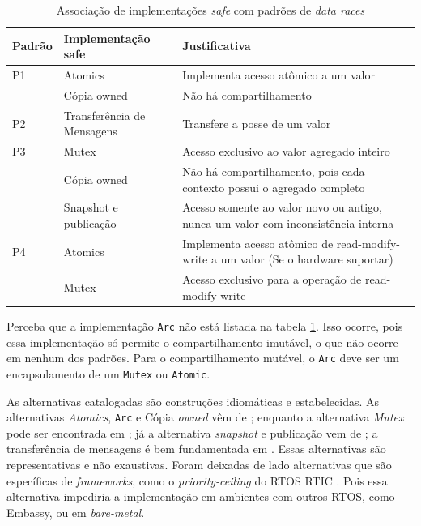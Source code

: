 \begin{table}[ht]
  \centering
  \caption{Associação de implementações \textit{safe} com padrões de \textit{data races}}
  \label{tab:impl-pattern}
  \begin{tabularx}{\textwidth}{>{\hsize=0.5\hsize}X >{\hsize=1.0\hsize}X >{\hsize=1.5\hsize}X}
    \toprule
    Padrão & Implementação safe & Justificativa  \\
    \midrule
    P1 & Atomics & Implementa acesso atômico a um valor \\
       & Cópia owned & Não há compartilhamento \\
    \hline
    P2 & Transferência de Mensagens & Transfere a posse de um valor \\
    \hline
    P3 & Mutex & Acesso exclusivo ao valor agregado inteiro \\
       & Cópia owned & Não há compartilhamento, pois cada contexto possui o agregado completo \\
       & Snapshot e publicação & Acesso somente ao valor novo ou antigo, nunca um valor com inconsistência interna \\
    \hline
    P4 & Atomics & Implementa acesso atômico de read-modify-write a um valor (Se o hardware suportar) \\
       & Mutex & Acesso exclusivo para a operação de read-modify-write \\
    \bottomrule
  \end{tabularx}
\end{table}

Perceba que a implementação \texttt{Arc} não está listada na tabela \ref{tab:impl-pattern}. Isso ocorre, pois essa implementação só permite o compartilhamento imutável, o que não ocorre em nenhum dos padrões. Para o compartilhamento mutável, o \texttt{Arc} deve ser um encapsulamento de um \texttt{Mutex} ou \texttt{Atomic}.

As alternativas catalogadas são construções idiomáticas e estabelecidas. As alternativas \textit{Atomics}, \texttt{Arc} e Cópia \textit{owned} vêm de \citep{doc:rust-atomic}; enquanto a alternativa \textit{Mutex} pode ser encontrada em \citep{doc:rust-mutex}; já a alternativa \textit{snapshot} e publicação vem de \citep{book:bos-atomics}; a transferência de mensagens é bem fundamentada em \citep{doc:rust-mpsc}. Essas alternativas são representativas e não exaustivas. Foram deixadas de lado alternativas que são específicas de \textit{frameworks}, como o \textit{priority-ceiling} do \ac{RTOS} \ac{RTIC} \citep{eriksson2013rtfm}. Pois essa alternativa impediria a implementação em ambientes com outros \ac{RTOS}, como Embassy, ou em \textit{bare-metal}.

